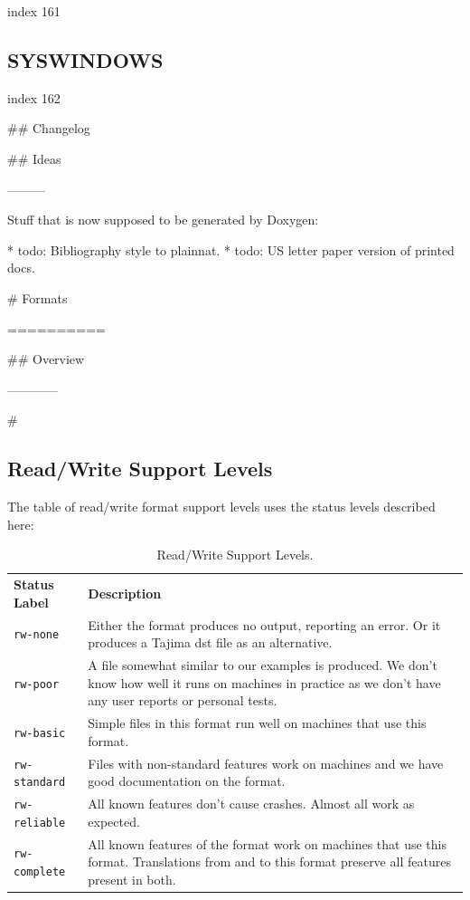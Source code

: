 \documentclass[a4paper]{report}
\begin{document}
{{{{{{{{{{{{{index 161

\subsection{SYSWINDOWS}

index 162


## Changelog}

## Ideas}
---------

Stuff that is now supposed to be generated by Doxygen:

* todo: Bibliography style to plainnat.
* todo: US letter paper version of printed docs.

# Formats}
==========

## Overview}
------------

#\subsection{Read/Write Support Levels}

The table of read/write format support levels uses the status levels described here:

\begin{longtable}{p{4cm} p{8cm}}
\caption{Read/Write Support Levels.}
\label{tab:read-write-support} \\
\textbf{Status Label} &
\textbf{Description} \\

\texttt{rw-none} &
Either the format produces no output, reporting an error. Or it produces a
Tajima dst file as an alternative. \\

\texttt{rw-poor} &
A file somewhat similar to our examples is produced. We don't know how well
it runs on machines in practice as we don't have any user reports or personal
tests. \\

\texttt{rw-basic} &
Simple files in this format run well on machines that use this format. \\

\texttt{rw-standard} &
Files with non-standard features work on machines and we have good documentation
on the format. \\

\texttt{rw-reliable} &
All known features don't cause crashes. Almost all work as expected. \\

\texttt{rw-complete} &
All known features of the format work on machines that use this format.
Translations from and to this format preserve all features present in both.
\end{longtable}

}}}}}}}}}
\end{document}
